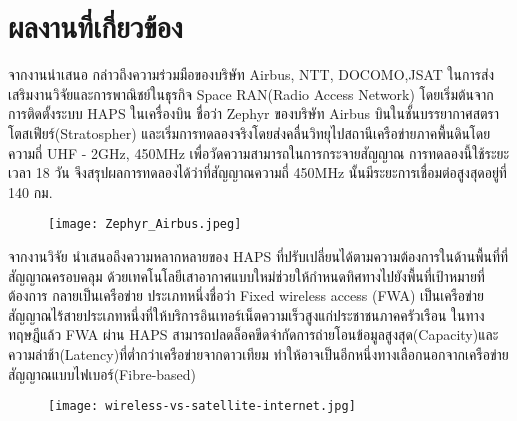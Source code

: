 \section{ผลงานที่เกี่ยวข้อง}

จากงานนำเสนอ \cite[HAPS Strategy of Space Compass]{spacecompass}
กล่าวถึงความร่วมมือของบริษัท Airbus, NTT, DOCOMO,JSAT ในการส่งเสริมงานวิจัยและการพาณิชย์ในธุรกิจ Space RAN(Radio Access Network)
โดยเริ่มต้นจากการติดตั้งระบบ HAPS ในเครื่องบิน ชื่อว่า Zephyr ของบริษัท Airbus บินในชั้นบรรยากาศสตราโตสเฟียร์(Stratospher) 
และเริ่มการทดลองจริงโดยส่งคลื่นวิทยุไปสถานีเครือข่ายภาคพื้นดินโดยความถี่
UHF - 2GHz, 450MHz เพื่อวัดความสามารถในการกระจายสัญญาณ การทดลองนี้ใช้ระยะเวลา 18 วัน 
จึงสรุปผลการทดลองได้ว่าที่สัญญาณความถี่ 450MHz นั้นมีระยะการเชื่อมต่อสูงสุดอยู่ที่ 140 กม. 
\\
\begin{figure}[h]
\centering
\texttt{[image: Zephyr\_Airbus.jpeg]}
\end{figure}

จากงานวิจัย \cite[High Altitude Platform Systems: Towers in the Skies]{towers}
นำเสนอถึงความหลากหลายของ HAPS ที่ปรับเปลี่ยนได้ตามความต้องการในด้านพื้นที่ที่สัญญาณครอบคลุม ด้วยเทคโนโลยีเสาอากาศแบบใหม่ช่วยให้กำหนดทิศทางไปยังพื้นที่เป้าหมายที่ต้องการ กลายเป็นเครือข่าย
ประเภทหนึ่งชื่อว่า Fixed wireless access (FWA) เป็นเครือข่ายสัญญาณไร้สายประเภทหนึ่งที่ให้บริการอินเทอร์เน็ตความเร็วสูงแก่ประชาชนภาคครัวเรือน ในทางทฤษฎีแล้ว
FWA ผ่าน HAPS สามารถปลดล็อคขีดจำกัดการถ่ายโอนข้อมูลสูงสุด(Capacity)และความล่าช้า(Latency)ที่ต่ำกว่าเครือข่ายจากดาวเทียม
ทำให้อาจเป็นอีกหนึ่งทางเลือกนอกจากเครือข่ายสัญญาณแบบไฟเบอร์(Fibre-based)
\\
\begin{figure}[h]
\centering
\texttt{[image: wireless-vs-satellite-internet.jpg]}
\end{figure}